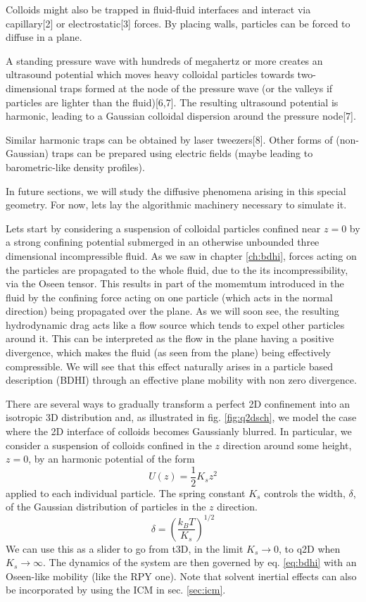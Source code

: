 \documentclass[ twoside,openright,titlepage,numbers=noenddot,%
headinclude,footinclude,cleardoublepage=empty,abstract=on,
BCOR=5mm,paper=a4,fontsize=11pt, dvipsnames
]{scrreprt}
\newcommand{\kT}{k_B T}
\newcommand{\half}{\frac{1}{2}}
\begin{document}
Colloids might also be trapped in fluid-fluid interfaces and interact via capillary[2] or electrostatic[3] forces. By placing walls, particles can be forced to diffuse in a plane\cite{Diffusion2D_Experiments_Rice}. 

A standing pressure wave with hundreds of megahertz or more creates an ultrasound potential which moves heavy colloidal particles towards two-dimensional traps formed at the node of the pressure wave (or the valleys if particles are lighter than the fluid)[6,7]. The resulting ultrasound potential is harmonic, leading to a Gaussian colloidal dispersion around the pressure node[7].

Similar harmonic traps can be obtained by laser tweezers[8]. Other forms of (non-Gaussian) traps can be prepared using electric fields (maybe leading to barometric-like density profiles).

In future sections, we will study the diffusive phenomena arising in this special geometry. For now, lets lay the algorithmic machinery necessary to simulate it.

Lets start by considering a suspension of colloidal particles confined near $z=0$ by a strong confining potential submerged in an otherwise unbounded three dimensional incompressible fluid. As we saw in chapter \ref{ch:bdhi}, forces acting on the particles are propagated to the whole fluid, due to the its incompressibility, via the Oseen tensor. This results in part of the momemtum introduced in the fluid by the confining force acting on one particle (which acts in the normal direction) being propagated over the plane. As we will soon see, the resulting hydrodynamic drag acts like a flow source which tends to expel other particles around it. This can be interpreted as the flow in the plane having a positive divergence, which makes the fluid (as seen from the plane) being effectively compressible. We will see that this effect naturally arises in a particle based description (\gls{BDHI}) through an effective plane mobility with non zero divergence\cite{Pelaez2017}.

There are several ways to gradually transform a perfect 2D confinement into an isotropic 3D distribution and, as illustrated in fig. \ref{fig:q2dsch}, we model the case where the 2D interface of colloids becomes Gaussianly blurred. In particular, we consider a suspension of colloids confined in the $z$ direction around some height, $z=0$, by an harmonic potential of the form
\begin{equation}
U(z)=\half K_sz^2
\end{equation}
applied to each individual particle.
The spring constant $K_s$ controls the width, $\delta$, of the Gaussian distribution of particles in the $z$ direction.
\begin{equation}
  \delta = \left(\frac{\kT}{K_s}\right)^{1/2}
\end{equation}
We can use this as a slider to go from t3D, in the limit $K_s\rightarrow 0$, to q2D when $K_s\rightarrow\infty$.
The dynamics of the system are then governed by eq. \eqref{eq:bdhi} with an Oseen-like mobility (like the \gls{RPY} one). Note that solvent inertial effects can also be incorporated by using the \gls{ICM} in sec. \ref{sec:icm}.
\end{document}
